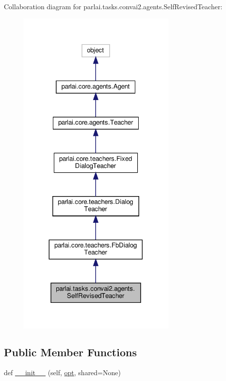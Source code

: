 Collaboration diagram for parlai.\+tasks.\+convai2.\+agents.\+Self\+Revised\+Teacher\+:\nopagebreak
\begin{figure}[H]
\begin{center}
\leavevmode
\includegraphics[width=224pt]{d0/d24/classparlai_1_1tasks_1_1convai2_1_1agents_1_1SelfRevisedTeacher__coll__graph}
\end{center}
\end{figure}
\subsection*{Public Member Functions}
\begin{DoxyCompactItemize}
\item 
def \hyperlink{classparlai_1_1tasks_1_1convai2_1_1agents_1_1SelfRevisedTeacher_a7e0e99704aa5772d371e1b03dfe5cf5a}{\+\_\+\+\_\+init\+\_\+\+\_\+} (self, \hyperlink{classparlai_1_1core_1_1teachers_1_1FbDialogTeacher_af7a9ec497b9cd0292d7b8fa220da7c28}{opt}, shared=None)
\end{DoxyCompactItemize}
